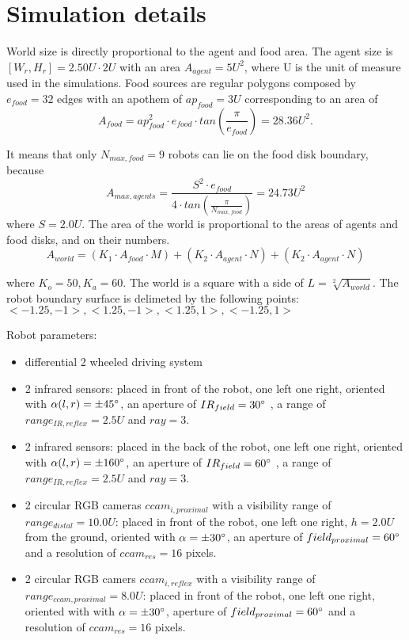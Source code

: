
\section{Simulation details \label{Appendix:simulation}}

World size is directly proportional to the agent and food area. The agent
size is $[W_{r},H_{r}]=2.50 U \cdot 2U$ with an area $A_{agent}=5 U^{2}$, where U is the unit of measure used in the simulations.
Food sources are regular polygons composed by $e_{food}=32$ edges with an apothem of $ap_{food}=3 U$ corresponding to an area of
\begin{equation}
A_{food}=ap_{food}^2 \cdot e_{food} \cdot tan(\frac{\pi}{e_{food}})=28.36 U^2.
\end{equation}

It means that only $N_{max,food}=9$ robots can lie on the food disk boundary, because
\begin{equation}
A_{max,agents}=\frac{S^{2} \cdot e_{food}}{4 \cdot tan(\frac{\pi}{N_{max,food}})}=24.73 U^{2}
\end{equation}
where $S=2.0 U$. The area of the world is proportional to the areas of agents and food disks, and on their numbers.
\begin{equation}
A_{world}=(K_{1} \cdot A_{food} \cdot M) + (K_{2} \cdot A_{agent} \cdot N) + (K_{2} \cdot A_{agent} \cdot N)
\end{equation}

where $K_{o}=50,K_{a}=60$. The world is a square with a side of $L=\sqrt[2]{A_{world}}$.
The robot boundary surface is delimeted by the following points: $<-1.25,-1>,<1.25,-1>,<1.25,1>,<-1.25,1>$

Robot parameters:
\begin{itemize}
\item differential 2 wheeled driving system
\item 2 infrared sensors: placed in front of the robot, one left one right,
oriented with $\alpha(l,r)=\pm45^{\circ}$, an aperture of $IR_{field}=30^{\circ}$ ,
a range of $range_{IR,reflex}=2.5 U$ and $ray=3$.

\item 2 infrared sensors: placed in the back of the robot, one left one right,
oriented with $\alpha(l,r)=\pm160^{\circ}$, an aperture of $IR_{field}=60^{\circ}$ ,
 a range of $range_{IR,reflex}=2.5 U$ and $ray=3$.

\item 2 circular RGB cameras $ccam_{i,proximal}$ with a visibility range of
 $range_{distal}=10.0 U$: placed in front of the robot, one left one right, $h=2.0 U$
from the ground, oriented with $\alpha=\pm30^{\circ}$, an aperture of
$field_{proximal}=60^{\circ}$  and a resolution of $ccam_{res}=16$ pixels.
\item 2 circular RGB camers $ccam_{i,reflex}$ with a visibility range of
$range_{ccam,proximal}=8.0 U$: placed in front of the robot, one left one right,
oriented with with $\alpha=\pm30^{\circ}$, aperture of $field_{proximal}=60^{\circ}$
and a resolution of $ccam_{res}=16$ pixels.
\end{itemize}


